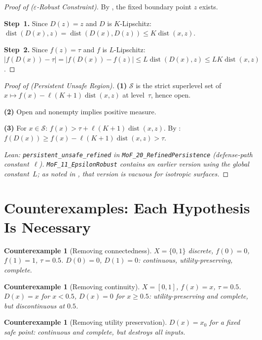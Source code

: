 \documentclass[11pt]{article}
\newtheorem{counterexample}[theorem]{Counterexample}
\newcommand{\dist}{\operatorname{dist}}
\begin{document}
\begin{proof}[Proof of  ($\varepsilon$-Robust Constraint)]
By , the fixed boundary point $z$ exists.

\textbf{Step~1.} Since $D(z) = z$ and $D$ is $K$-Lipschitz:
$\dist(D(x), z) = \dist(D(x), D(z)) \leq K\dist(x, z)$.

\textbf{Step~2.} Since $f(z) = \tau$ and $f$ is $L$-Lipschitz:
$|f(D(x)) - \tau| = |f(D(x)) - f(z)| \leq L\dist(D(x), z) \leq
LK\dist(x, z)$.
\end{proof}

\begin{proof}[Proof of  (Persistent Unsafe Region)]
\textbf{(1)} $\mathcal{S}$ is the strict superlevel set of
$x \mapsto f(x) - \ell(K+1)\dist(x,z)$ at level~$\tau$, hence open.

\textbf{(2)} Open and nonempty implies positive measure.

\textbf{(3)} For $x \in \mathcal{S}$:
$f(x) > \tau + \ell(K+1)\dist(x,z)$. By :
$f(D(x)) \geq f(x) - \ell(K+1)\dist(x,z) > \tau$.

\noindent\emph{Lean:
\textup{\texttt{persistent\_unsafe\_refined}} in
\textup{\texttt{MoF\_20\_RefinedPersistence}}
(defense-path constant~$\ell$).
\textup{\texttt{MoF\_11\_EpsilonRobust}} contains an earlier version
using the global constant~$L$; as noted in
, that version is vacuous for isotropic surfaces.}
\end{proof}


\section{Counterexamples: Each Hypothesis Is Necessary}
\label{app:counterexamples}

\begin{counterexample}[Removing connectedness]
$X = \{0,1\}$ discrete, $f(0)=0$, $f(1)=1$, $\tau=0.5$.
$D(0)=0$, $D(1)=0$: continuous, utility-preserving, complete.
\end{counterexample}

\begin{counterexample}[Removing continuity]
$X=[0,1]$, $f(x)=x$, $\tau=0.5$. $D(x)=x$ for $x<0.5$,
$D(x)=0$ for $x \geq 0.5$: utility-preserving and complete,
but discontinuous at $0.5$.
\end{counterexample}

\begin{counterexample}[Removing utility preservation]
$D(x) = x_0$ for a fixed safe point: continuous and complete,
but destroys all inputs.
\end{counterexample}
\end{document}
